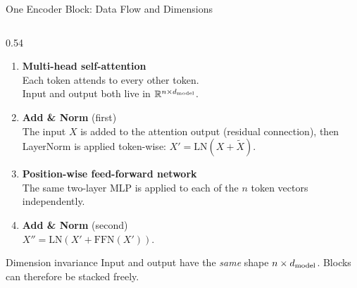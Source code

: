 \documentclass[aspectratio=169]{beamer}
\begin{document}
\begin{frame}{One Encoder Block: Data Flow and Dimensions}
\begin{columns}[T]
\begin{column}{0.54\textwidth}
\medskip
\begin{enumerate}\itemsep4pt
  \item \textbf{Multi-head self-attention}\\
    Each token attends to every other token.\\
    Input and output both live in
    $\mathbb{R}^{n \times d_{\mathrm{model}}}$.

  \item \textbf{Add \& Norm} (first)\\
    The input $X$ is added to the attention output
    (residual connection), then Layer\-Norm is applied
    token-wise: $X' = \mathrm{LN}(X + \widetilde{X})$.

  \item \textbf{Position-wise feed-forward network}\\
    The same two-layer MLP is applied to each of the $n$
    token vectors independently.

  \item \textbf{Add \& Norm} (second)\\
    $X'' = \mathrm{LN}(X' + \mathrm{FFN}(X'))$.
\end{enumerate}

\medskip
\begin{alertblock}{Dimension invariance}
Input and output have the \emph{same} shape
$n \times d_{\mathrm{model}}$. Blocks can therefore be
stacked freely.
\end{alertblock}
\end{column}

\end{columns}
\end{frame}
%
%
\end{document}
